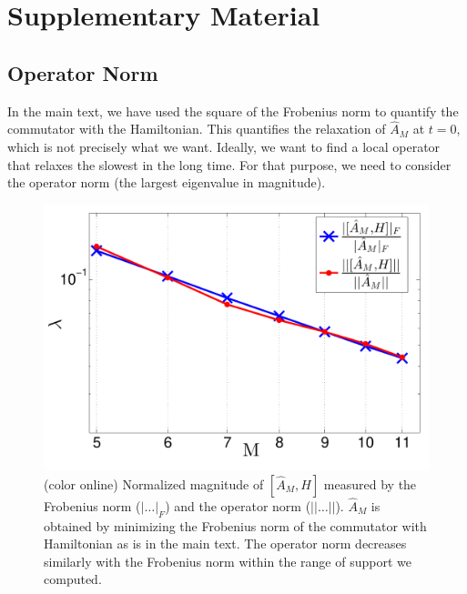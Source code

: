 \documentclass[twocolumn,superscriptaddress, prb]{revtex4-1}
\begin{document}
\section*{Supplementary Material}

\subsection{Operator Norm}
In the main text, we have used the square of the Frobenius norm to quantify the commutator with the Hamiltonian.
This quantifies the relaxation of $\hat{A}_M$ at $t = 0$,
which is not precisely what we want. Ideally, we want to find a local operator
that relaxes the slowest in the long time.
For that purpose, we need to consider the operator norm (the largest eigenvalue in magnitude).

\begin{figure}
\includegraphics[width=1.0\linewidth]{op_norm.pdf}
\centering
\caption{(color online) Normalized magnitude of $[\hat{A}_M, H]$ measured by the Frobenius norm ($|\ldots|_F$) and the operator norm ($||\ldots||$).
$\hat{A}_M$ is obtained by minimizing the Frobenius norm of the commutator with Hamiltonian as is in the main text.
The operator norm decreases similarly with the Frobenius norm within the range of support we computed.
}
\label{fig:op_norm}
\end{figure}
\end{document}
